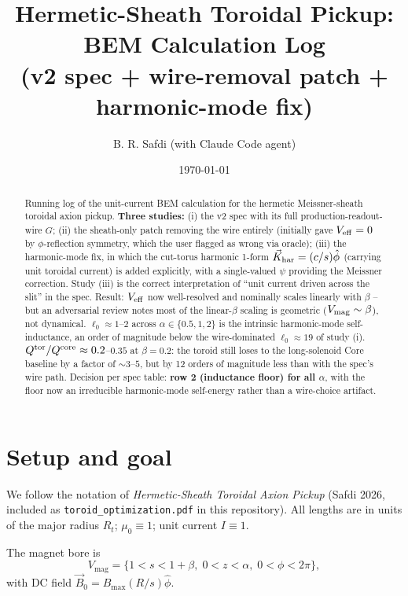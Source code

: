 \documentclass[11pt]{article}
\title{Hermetic-Sheath Toroidal Pickup: BEM Calculation Log\\
(v2 spec + wire-removal patch + harmonic-mode fix)}
\author{B. R. Safdi (with Claude Code agent)}
\date{\today}
\newcommand{\Rt}{R_t}
\newcommand{\Bmax}{B_{\mathrm{max}}}
\begin{document}
\maketitle

\begin{abstract}
Running log of the unit-current BEM calculation for the hermetic
Meissner-sheath toroidal axion pickup.  \textbf{Three studies:}
(i) the v2 spec with its full production-readout-wire $G$;
(ii) the sheath-only patch removing the wire entirely (initially
gave $V_{\rm eff}=0$ by $\phi$-reflection symmetry, which the user
flagged as wrong via oracle); (iii) the harmonic-mode fix, in which
the cut-torus harmonic 1-form $\vec K_{\rm har}=(c/s)\hat\phi$
(carrying unit toroidal current) is added explicitly, with a
single-valued $\psi$ providing the Meissner correction.  Study (iii)
is the correct interpretation of ``unit current driven across the
slit'' in the spec.  Result: $V_{\rm eff}$ now well-resolved and
nominally scales linearly with $\beta$ -- but an adversarial review
notes most of the linear-$\beta$ scaling is geometric
($V_{\rm mag}\sim\beta$), not dynamical.  $\ell_0\approx 1$--$2$
across $\alpha\in\{0.5,1,2\}$ is the intrinsic harmonic-mode
self-inductance, an order of magnitude below the wire-dominated
$\ell_0\approx 19$ of study (i).  $Q^{\rm tor}/Q^{\rm core}\approx
0.2$--$0.35$ at $\beta=0.2$: the toroid still loses to the
long-solenoid Core baseline by a factor of $\sim 3$--$5$, but by 12
orders of magnitude less than with the spec's wire path.  Decision
per spec table: \textbf{row 2 (inductance floor) for all $\alpha$},
with the floor now an irreducible harmonic-mode self-energy rather
than a wire-choice artifact.
\end{abstract}

\tableofcontents

\section{Setup and goal}
\label{sec:setup}

We follow the notation of \emph{Hermetic-Sheath Toroidal Axion Pickup}
(Safdi 2026, included as \texttt{toroid\_optimization.pdf} in this
repository). All lengths are in units of the major radius $\Rt$;
$\mu_0\equiv 1$; unit current $I\equiv 1$.

The magnet bore is
\begin{equation}
V_{\mathrm{mag}}=\{1<s<1+\beta,\;0<z<\alpha,\;0<\phi<2\pi\},
\end{equation}
with DC field $\vec B_0=\Bmax(R/s)\hat\phi$.
\end{document}
